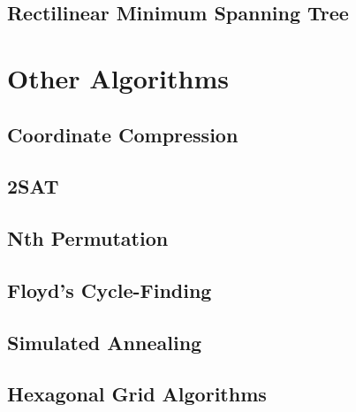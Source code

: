 \documentclass[8pt,a4paper,landscape,oneside]{amsart}
\begin{document}
\begin{multicols*}{3}
	\subsection{Rectilinear Minimum Spanning Tree}
\section{Other Algorithms}
	\subsection{Coordinate Compression}
	\subsection{2SAT}
	\subsection{Nth Permutation}
	\subsection{Floyd's Cycle-Finding}
	\subsection{Simulated Annealing}
	\subsection{Hexagonal Grid Algorithms}

\clearpage



\end{multicols*}
\end{document}
